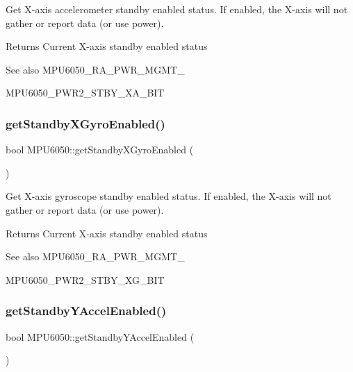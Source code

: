 Get X-\/axis accelerometer standby enabled status. If enabled, the X-\/axis will not gather or report data (or use power). \begin{DoxyReturn}{Returns}
Current X-\/axis standby enabled status 
\end{DoxyReturn}
\begin{DoxySeeAlso}{See also}
M\+P\+U6050\+\_\+\+R\+A\+\_\+\+P\+W\+R\+\_\+\+M\+G\+M\+T\+\_ 

M\+P\+U6050\+\_\+\+P\+W\+R2\+\_\+\+S\+T\+B\+Y\+\_\+\+X\+A\+\_\+\+B\+IT 
\end{DoxySeeAlso}
\mbox{\label{class_m_p_u6050_acb5fde4167aa54fbbe84706d577a48a6}} 
\subsubsection{\texorpdfstring{getStandbyXGyroEnabled()}{getStandbyXGyroEnabled()}}
{\footnotesize\ttfamily bool M\+P\+U6050\+::get\+Standby\+X\+Gyro\+Enabled (\begin{DoxyParamCaption}{ }\end{DoxyParamCaption})}

Get X-\/axis gyroscope standby enabled status. If enabled, the X-\/axis will not gather or report data (or use power). \begin{DoxyReturn}{Returns}
Current X-\/axis standby enabled status 
\end{DoxyReturn}
\begin{DoxySeeAlso}{See also}
M\+P\+U6050\+\_\+\+R\+A\+\_\+\+P\+W\+R\+\_\+\+M\+G\+M\+T\+\_ 

M\+P\+U6050\+\_\+\+P\+W\+R2\+\_\+\+S\+T\+B\+Y\+\_\+\+X\+G\+\_\+\+B\+IT 
\end{DoxySeeAlso}
\mbox{\label{class_m_p_u6050_a104f2ec438d745f8fdeec202bae09b48}} 
\subsubsection{\texorpdfstring{getStandbyYAccelEnabled()}{getStandbyYAccelEnabled()}}
{\footnotesize\ttfamily bool M\+P\+U6050\+::get\+Standby\+Y\+Accel\+Enabled (\begin{DoxyParamCaption}{ }\end{DoxyParamCaption})}

